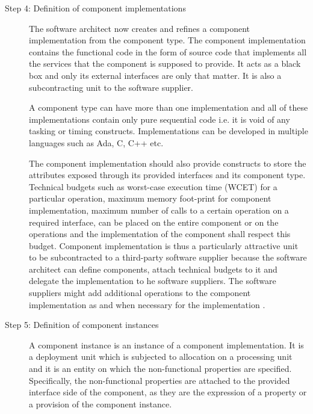 \begin{description}
\item [Step 4: Definition of component implementations] The software architect now creates and refines a component implementation from the component type. The component implementation contains the functional code in the form of source code that implements all the services that the component is supposed to provide. It acts as a  black box and only its external interfaces are only that matter. It is also a subcontracting unit to the software supplier. 

A component type can have more than one implementation and all of these implementations contain only pure sequential code i.e. it is void of any tasking or timing constructs. Implementations can be developed in multiple languages such as Ada, C, C++ etc.  

The component implementation should also provide constructs to store the attributes exposed through its provided interfaces and its component type. Technical budgets such as worst-case execution time (WCET) for a particular operation, maximum memory foot-print for component implementation, maximum number of calls to a certain operation on a required interface, can be placed on the entire component or on the operations and the implementation of the component shall respect this budget. Component implementation is thus a particularly attractive unit to be subcontracted to a third-party software supplier because the software architect can define components, attach technical budgets to it and delegate the implementation to he software suppliers. The software suppliers might add additional operations to the component implementation as and when necessary for the implementation \cite{CompBasedProcess}.  

\item [Step 5: Definition of component instances] A component instance is an instance of a component implementation. It is a deployment unit which is subjected to allocation on a processing unit and it is an entity on which the non-functional properties are specified. Specifically, the non-functional properties are attached to the provided interface side of the component, as they are the expression of a property or a provision of the component instance.


\end{description}
